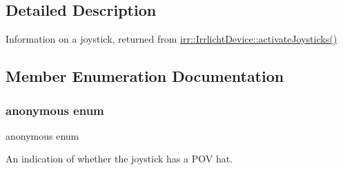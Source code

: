 \subsection{Detailed Description}
Information on a joystick, returned from \hyperlink{classirr_1_1IrrlichtDevice_af06f8d2c4fdffd1f879e46685bcbc6e3}{irr\+::\+Irrlicht\+Device\+::activate\+Joysticks()} 

\subsection{Member Enumeration Documentation}
\mbox{\label{structirr_1_1SJoystickInfo_a5ab1b9b6969289f70b321d3c3657d999}} 
\subsubsection{\texorpdfstring{anonymous enum}{anonymous enum}}
{\footnotesize\ttfamily anonymous enum}



An indication of whether the joystick has a P\+OV hat. 

